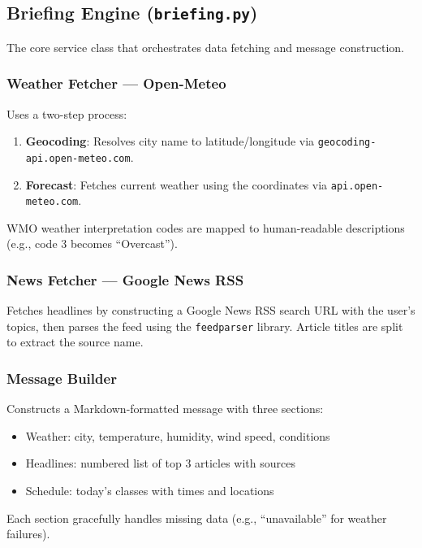 \documentclass[12pt, a4paper]{article}
\begin{document}
\subsection{Briefing Engine (\texttt{briefing.py})}

The core service class that orchestrates data fetching and message construction.

\subsubsection{Weather Fetcher --- Open-Meteo}

Uses a two-step process:
\begin{enumerate}[leftmargin=2em]
  \item \textbf{Geocoding}: Resolves city name to latitude/longitude via \texttt{geocoding-api.open-meteo.com}.
  \item \textbf{Forecast}: Fetches current weather using the coordinates via \texttt{api.open-meteo.com}.
\end{enumerate}

WMO weather interpretation codes are mapped to human-readable descriptions (e.g., code 3 becomes ``Overcast'').

\subsubsection{News Fetcher --- Google News RSS}

Fetches headlines by constructing a Google News RSS search URL with the user's topics, then parses the feed using the \texttt{feedparser} library. Article titles are split to extract the source name.

\subsubsection{Message Builder}

Constructs a Markdown-formatted message with three sections:
\begin{itemize}[leftmargin=2em]
  \item Weather: city, temperature, humidity, wind speed, conditions
  \item Headlines: numbered list of top 3 articles with sources
  \item Schedule: today's classes with times and locations
\end{itemize}

Each section gracefully handles missing data (e.g., ``unavailable'' for weather failures).
\end{document}
